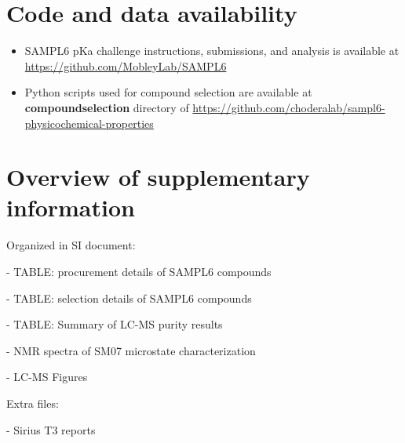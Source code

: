 \documentclass[9pt,lineno]{elife}
\begin{document}
\section{Code and data availability}
\begin{minipage}{15cm}
\begin{itemize}

\item SAMPL6 pKa challenge instructions, submissions, and analysis is available at  \href{https://github.com/MobleyLab/SAMPL6}{https://github.com/MobleyLab/SAMPL6}

\item Python scripts used for compound selection are available at \textbf{compound\textunderscore selection} directory of  
\href{https://github.com/choderalab/sampl6\textendash physicochemical\textendash properties}{https://github.com/choderalab/sampl6-physicochemical-properties}

\end{itemize}
\end{minipage}



\section{Overview of supplementary information}

Organized in SI document:

- TABLE: procurement details of SAMPL6 compounds  

- TABLE: selection details of SAMPL6 compounds  

- TABLE: Summary of LC-MS purity results

- NMR spectra of SM07 microstate characterization  

- LC-MS Figures  


Extra files:  

- Sirius T3 reports  
\end{document}
